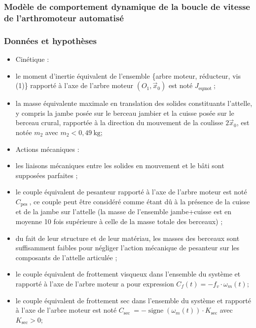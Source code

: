 \subsubsection{Modèle de comportement dynamique de la boucle de vitesse de l'arthromoteur automatisé}
 \subsubsection*{Données et hypothèses}
\begin{itemize}
  \item Cinétique :

  \item le moment d'inertie équivalent de l'ensemble \{arbre moteur, réducteur, vis (1)\} rapporté à l'axe de l'arbre moteur $\left(O_{1}, \vec{x}_{0}\right)$ est noté $J_{\text {eqmot }}$;

  \item la masse équivalente maximale en translation des solides constituants l'attelle, y compris la jambe posée sur le berceau jambier et la cuisse posée sur le berceau crural, rapportée à la direction du mouvement de la coulisse $2 \vec{x}_{0}$, est notée $m_{2}$ avec $m_{2}<0,49 \mathrm{~kg}$;

  \item Actions mécaniques :

  \item les liaisons mécaniques entre les solides en mouvement et le bâti sont supposées parfaites ;

  \item le couple équivalent de pesanteur rapporté à l'axe de l'arbre moteur est noté $C_{\text {pes }}$, ce couple peut être considéré comme étant dû à la présence de la cuisse et de la jambe sur l'attelle (la masse de l'ensemble jambe+cuisse est en moyenne 10 fois supérieure à celle de la masse totale des berceaux) ;

  \item du fait de leur structure et de leur matériau, les masses des berceaux sont suffisamment faibles pour négliger l'action mécanique de pesanteur sur les composants de l'attelle articulée ;

  \item le couple équivalent de frottement visqueux dans l'ensemble du système et rapporté à l'axe de l'arbre moteur a pour expression $C_{f}(t)=-f_{v} \cdot \omega_{m}(t)$;

  \item le couple équivalent de frottement sec dans l'ensemble du système et rapporté à l'axe de l'arbre moteur est noté $C_{\text {sec }}=-\operatorname{signe}\left(\omega_{m}(t)\right) \cdot K_{\mathrm{sec}}$ avec $K_{\mathrm{sec}}>0$;

\end{itemize}

